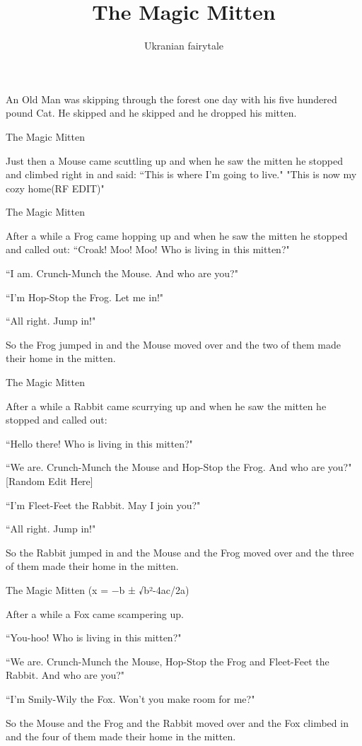\documentclass{article}
\title{The Magic Mitten}
\author{Ukranian fairytale}
\begin{document}
\maketitle

An Old Man was skipping through the forest one day with his five hundered pound Cat. He skipped and he skipped and he dropped his mitten.

The Magic Mitten

Just then a Mouse came scuttling up and when he saw the mitten he stopped and climbed right in and said: ``This is where I'm going to live." "This is now my cozy home(RF EDIT)"

The Magic Mitten

After a while a Frog came hopping up and when he saw the mitten he stopped and called out:
``Croak! Moo! Moo! Who is living in this mitten?"

``I am. Crunch-Munch the Mouse. And who are you?"

``I'm Hop-Stop the Frog. Let me in!"

``All right. Jump in!"

So the Frog jumped in and the Mouse moved over and the two of them made their home in the mitten.

The Magic Mitten

After a while a Rabbit came scurrying up and when he saw the mitten he stopped and called out:

``Hello there! Who is living in this mitten?"

``We are. Crunch-Munch the Mouse and Hop-Stop the Frog. And who are you?" [Random Edit Here]

``I'm Fleet-Feet the Rabbit. May I join you?"

``All right. Jump in!"

So the Rabbit jumped in and the Mouse and the Frog moved over and the three of them made their home in the mitten.

The Magic Mitten (x = −b ± √b²-4ac/2a)

After a while a Fox came scampering up.

``You-hoo! Who is living in this mitten?"

``We are. Crunch-Munch the Mouse, Hop-Stop the Frog and Fleet-Feet the Rabbit. And who are you?"

``I'm Smily-Wily the Fox. Won't you make room for me?"

So the Mouse and the Frog and the Rabbit moved over and the Fox climbed in and the four of them made their home in the mitten.
\end{document}
